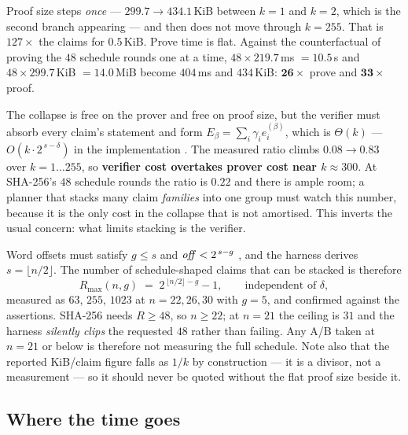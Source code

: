 \noindent
Proof size steps \emph{once} --- $299.7\to434.1$\,KiB between $k{=}1$ and
$k{=}2$, which is the second branch appearing --- and then does not move through
$k{=}255$. That is $127\times$ the claims for $0.5$\,KiB. Prove time is flat.
Against the counterfactual of proving the $48$ schedule rounds one at a time,
$48\times219.7$\,ms $=10.5$\,s and $48\times299.7$\,KiB $=14.0$\,MiB become
$404$\,ms and $434$\,KiB: $\mathbf{26\times}$ prove and $\mathbf{33\times}$ proof.

\begin{warning}
\label{warn:verifyk}
The collapse is free on the prover and free on proof size, but the verifier must
absorb every claim's statement and form $E_\beta=\sum_i\gamma_ie_i^{(\beta)}$,
which is $\Theta(k)$ --- $O(k\cdot2^{\,s-\delta})$ in the implementation
. The measured ratio climbs $0.08\to0.83$ over
$k{=}1\dots255$, so \textbf{verifier cost overtakes prover cost near
$k\approx300$}. At SHA-256's $48$ schedule rounds the ratio is $0.22$ and there
is ample room; a planner that stacks many claim \emph{families} into one group
must watch this number, because it is the only cost in the collapse that is not
amortised. This inverts the usual concern: what limits stacking is the verifier.
\end{warning}

\begin{warning}
\label{warn:envelope}
Word offsets must satisfy $g\leq s$ and $\mathit{off}<2^{\,s-g}$
, and the harness derives $s=\lfloor n/2\rfloor$. The number of
schedule-shaped claims that can be stacked is therefore
\[
  R_{\max}(n,g)\;=\;2^{\,\lfloor n/2\rfloor-g}-1,
  \qquad\text{independent of }\delta ,
\]
measured as $63$, $255$, $1023$ at $n{=}22,26,30$ with $g{=}5$, and confirmed
against the assertions. SHA-256 needs $R\geq48$, so \textbf{$n\geq22$}; at
$n{=}21$ the ceiling is $31$ and the harness \emph{silently clips} the requested
$48$ rather than failing. Any A/B taken at $n{=}21$ or below is therefore not
measuring the full schedule. Note also that the reported KiB/claim figure falls
as $1/k$ by construction --- it is a divisor, not a measurement --- so it should
never be quoted without the flat proof size beside it.
\end{warning}

\subsection{Where the time goes}

